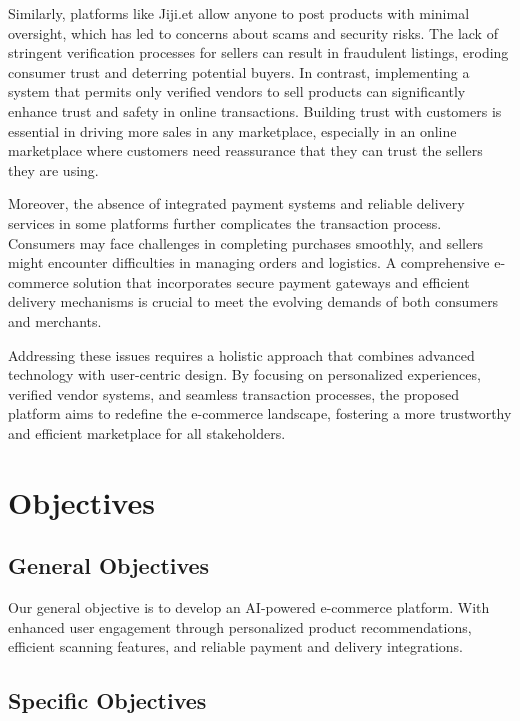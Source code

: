 \documentclass[12pt]{report}
\begin{document}
Similarly, platforms like Jiji.et allow anyone to post products with minimal oversight, which
has led to concerns about scams and security risks. The lack of stringent verification
processes for sellers can result in fraudulent listings, eroding consumer trust and deterring
potential buyers. In contrast, implementing a system that permits only verified vendors to sell
products can significantly enhance trust and safety in online transactions. Building trust with
customers is essential in driving more sales in any marketplace, especially in an online
marketplace where customers need reassurance that they can trust the sellers they are using\cite{c7}.

Moreover, the absence of integrated payment systems and reliable delivery services in some
platforms further complicates the transaction process. Consumers may face challenges in
completing purchases smoothly, and sellers might encounter difficulties in managing orders
and logistics. A comprehensive e-commerce solution that incorporates secure payment
gateways and efficient delivery mechanisms is crucial to meet the evolving demands of both
consumers and merchants.

Addressing these issues requires a holistic approach that combines advanced technology with
user-centric design. By focusing on personalized experiences, verified vendor systems, and
seamless transaction processes, the proposed platform aims to redefine the e-commerce
landscape, fostering a more trustworthy and efficient marketplace for all stakeholders.

\section{Objectives}

\subsection{General Objectives}

Our general objective is to develop an AI-powered e-commerce platform. With enhanced user
engagement through personalized product recommendations, efficient scanning features, and
reliable payment and delivery integrations.

\subsection{Specific Objectives}
\end{document}

